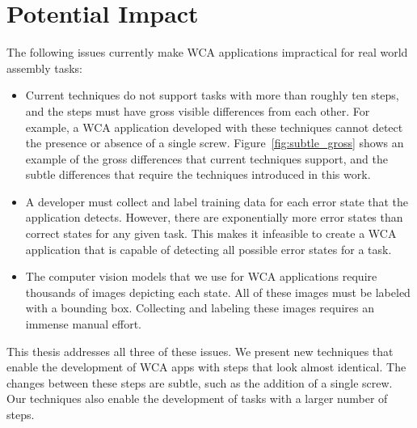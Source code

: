 \section{Potential Impact}

The following issues currently make WCA applications impractical for real world
assembly tasks:
\begin{itemize}
\item Current techniques do not support tasks with more than roughly ten
    steps, and the
    steps must have gross visible differences from each other.
    For example, a WCA application developed with these techniques cannot detect
  the presence or absence of a single screw.
  Figure~{\ref{fig:subtle_gross}} shows an example of the gross differences that
  current techniques support, and the subtle differences that require the
  techniques introduced in this work.
\item A developer must collect and label training data for each error state
  that the application detects.
  However, there are exponentially more error states than correct
  states for any given task.
  This makes it infeasible to create a WCA application that is capable of
  detecting all possible error states for a task.
\item The computer vision models that we use for WCA applications require
  thousands of images depicting each state.
  All of these images must be labeled with a bounding box.
  Collecting and labeling these images requires an immense manual effort.
\end{itemize}

This thesis addresses all three of these issues.
We present new techniques that enable the development of WCA apps with steps
that look almost identical.
The changes between these steps are subtle, such as the addition of a single
screw.
Our techniques also enable the development of tasks with a larger number of
steps.

